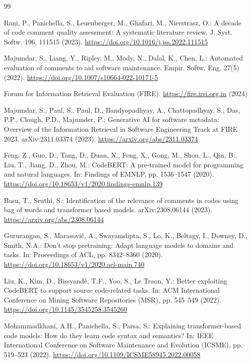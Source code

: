 \documentclass[runningheads]{ceurart}
\begin{document}
\begin{thebibliography}{99}

Rani, P., Panichella, S., Leuenberger, M., Ghafari, M., Nierstrasz, O.: 
A decade of code comment quality assessment: A systematic literature review. 
J. Syst. Softw. 196, 111515 (2023). 
\url{https://doi.org/10.1016/j.jss.2022.111515}

Majumdar, S., Liang, Y., Ripley, M., Mody, N., Dalal, K., Chen, L.: 
Automated evaluation of comments to aid software maintenance. 
Empir. Softw. Eng. 27(5) (2022). 
\url{https://doi.org/10.1007/s10664-022-10171-5}

Forum for Information Retrieval Evaluation (FIRE). 
\url{https://fire.irsi.org.in} (2024)

Majumdar, S., Paul, S., Paul, D., Bandyopadhyay, A., Chattopadhyay, S., Das, P.P., Clough, P.D., Majumder, P.: 
Generative AI for software metadata: Overview of the Information Retrieval in Software Engineering Track at FIRE 2023. 
arXiv:2311.03374 (2023). 
\url{https://arxiv.org/abs/2311.03374}

Feng, Z., Guo, D., Tang, D., Duan, N., Feng, X., Gong, M., Shou, L., Qin, B., Liu, T., Jiang, D., Zhou, M.: 
CodeBERT: A pre-trained model for programming and natural languages. 
In: Findings of EMNLP, pp. 1536--1547 (2020). 
\url{https://doi.org/10.18653/v1/2020.findings-emnlp.139}

Basu, T., Sruthi, S.: 
Identification of the relevance of comments in codes using bag of words and transformer based models. 
arXiv:2308.06144 (2023). 
\url{https://arxiv.org/abs/2308.06144}

Gururangan, S., Marasovi\'{c}, A., Swayamdipta, S., Lo, K., Beltagy, I., Downey, D., Smith, N.A.: 
Don't stop pretraining: Adapt language models to domains and tasks. 
In: Proceedings of ACL, pp. 8342--8360 (2020). 
\url{https://doi.org/10.18653/v1/2020.acl-main.740}

Liu, K., Kim, D., Bissyand\'{e}, T.F., Yoo, S., Le Traon, Y.: 
Better exploiting CodeBERT to support source code-related tasks. 
In: ACM International Conference on Mining Software Repositories (MSR), pp. 545--549 (2022). 
\url{https://doi.org/10.1145/3545258.3545260}

Mohammadkhani, A.H., Panichella, S., Parsa, S.: 
Explaining transformer-based code models: How do they learn code syntax and semantics? 
In: IEEE International Conference on Software Maintenance and Evolution (ICSME), pp. 519--523 (2022). 
\url{https://doi.org/10.1109/ICSME58945.2022.00058}


\end{thebibliography}
\end{document}
